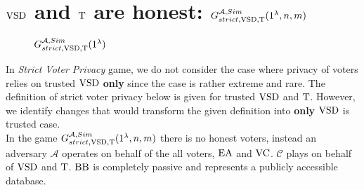 \section{$\operatorname{VSD}$ and $\operatorname{T}$ are honest: $G_{strict,\operatorname{VSD},\operatorname{T}}^{\mathcal{A},Sim}(1^{\lambda},n,m)$}
  \begin{figure}[h!]
 
        \caption{ $G_{strict,\operatorname{VSD},\operatorname{T}}^{\mathcal{A},Sim}(1^{\lambda})$}
        \label{VSD is honest}
\end{figure}

In \textit{Strict Voter Privacy} game, we do not consider the case where privacy of voters relies on trusted $\operatorname{VSD}$ \textbf{only} since the case is rather extreme and rare. The definition of strict voter privacy below is given for trusted $\operatorname{VSD}$ and $\operatorname{T}$. However, we identify changes that would transform the given definition into \textbf{only} $\operatorname{VSD}$ is trusted case.\\

 In the game $G_{strict,\operatorname{VSD},\operatorname{T}}^{\mathcal{A}, Sim}(1^{\lambda},n,m)$ there is no honest voters, instead an adversary $\mathcal{A}$ operates on behalf of the all voters, $\operatorname{EA}$ and $\operatorname{VC}$.  $\mathcal{C}$ plays on behalf of $\operatorname{VSD}$ and $\operatorname{T}$.  $\operatorname{BB}$ is completely passive and represents a publicly accessible database.\\
 
